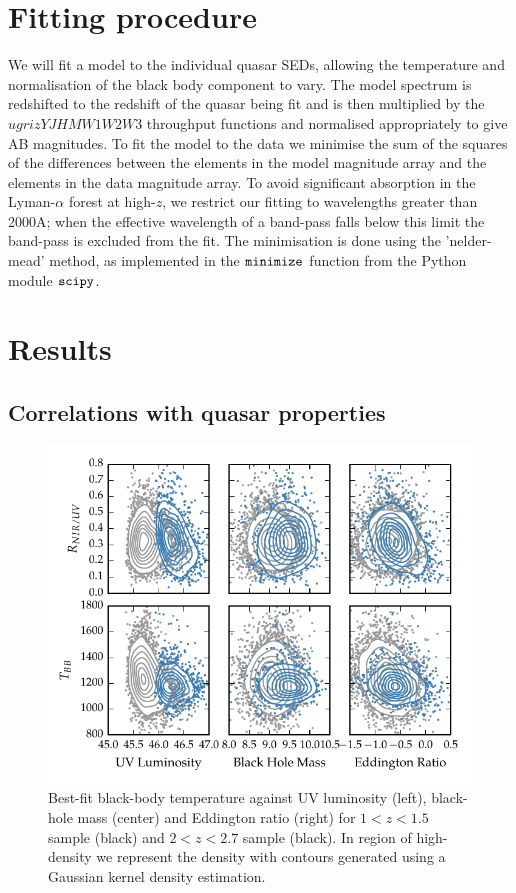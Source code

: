 \section{Fitting procedure}

We will fit a model to the individual quasar SEDs, allowing the temperature and normalisation of the black body component to vary. 
The model spectrum is redshifted to the redshift of the quasar being fit and is then multiplied by the $ugrizYJHMW1W2W3$ throughput functions and normalised appropriately to give AB magnitudes. 
To fit the model to the data we minimise the sum of the squares of the differences between the elements in the model magnitude array and the elements in the data magnitude array. 
To avoid significant absorption in the Lyman-$\alpha$ forest at high-$z$, we restrict our fitting to wavelengths greater than 2000A; when the effective wavelength of a band-pass falls below this limit the band-pass is excluded from the fit. 
The minimisation is done using the 'nelder-mead' method, as implemented in the ${\tt minimize}$ function from the Python module ${\tt scipy}$. 

\section{Results}

\subsection{Correlations with quasar properties}

\begin{figure}
  \centering
  \includegraphics[width=\textwidth]{figures/chapter05/correlations_contour.pdf}
  \caption{Best-fit black-body temperature against UV luminosity (left), black-hole mass (center) and Eddington ratio (right) for $1 < z < 1.5$ sample (black) and $2 < z < 2.7$ sample (black). In region of high-density we represent the density with contours generated using a Gaussian kernel density estimation. }
  \label{fig:}
\end{figure}

